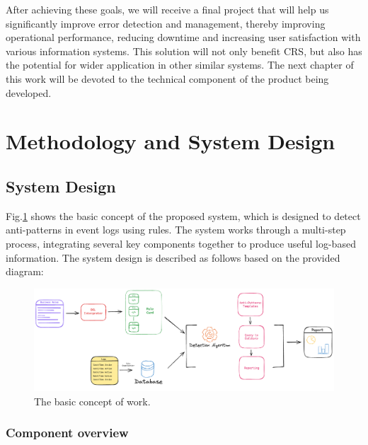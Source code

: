 \documentclass[12pt, times]{article}
\begin{document}
\hspace*{5mm}After achieving these goals, we will receive a final project that will help us significantly improve error detection and management, thereby improving operational performance, reducing downtime and increasing user satisfaction with various information systems. This solution will not only benefit CRS, but also has the potential for wider application in other similar systems. The next chapter of this work will be devoted to the technical component of the product being developed.


\clearpage
\newpage

\section{Methodology and System Design}
\subsection{System Design}

\hspace{5mm}Fig.\ref{fig:basic_concept} shows the basic concept of the proposed system, which is designed to detect anti-patterns in event logs using rules. The system works through a multi-step process, integrating several key components together to produce useful log-based information. The system design \cite{system_design} is described as follows based on the provided diagram:

	\begin{figure}[h]
		\centering
		\includegraphics[scale=0.285]{basic_concept}
		\caption{The basic concept of work.}
		\label{fig:basic_concept}
	\end{figure}
	
	\subsubsection*{Component overview}
	
\end{document}

